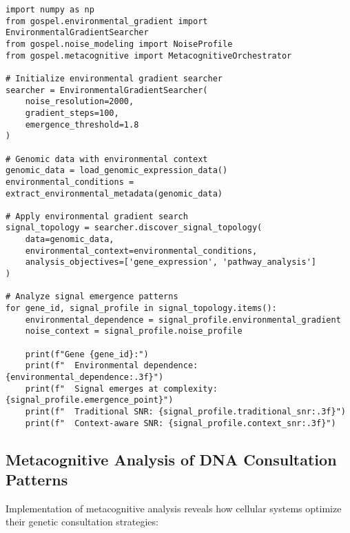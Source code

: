 \documentclass[12pt,a4paper]{article}
\begin{document}
\begin{lstlisting}[style=pythonstyle, caption=Environmental Gradient Search in Genomic Analysis]
import numpy as np
from gospel.environmental_gradient import EnvironmentalGradientSearcher
from gospel.noise_modeling import NoiseProfile
from gospel.metacognitive import MetacognitiveOrchestrator

# Initialize environmental gradient searcher
searcher = EnvironmentalGradientSearcher(
    noise_resolution=2000,
    gradient_steps=100,
    emergence_threshold=1.8
)

# Genomic data with environmental context
genomic_data = load_genomic_expression_data()
environmental_conditions = extract_environmental_metadata(genomic_data)

# Apply environmental gradient search
signal_topology = searcher.discover_signal_topology(
    data=genomic_data,
    environmental_context=environmental_conditions,
    analysis_objectives=['gene_expression', 'pathway_analysis']
)

# Analyze signal emergence patterns
for gene_id, signal_profile in signal_topology.items():
    environmental_dependence = signal_profile.environmental_gradient
    noise_context = signal_profile.noise_profile
    
    print(f"Gene {gene_id}:")
    print(f"  Environmental dependence: {environmental_dependence:.3f}")
    print(f"  Signal emerges at complexity: {signal_profile.emergence_point}")
    print(f"  Traditional SNR: {signal_profile.traditional_snr:.3f}")
    print(f"  Context-aware SNR: {signal_profile.context_snr:.3f}")
\end{lstlisting}

\subsection{Metacognitive Analysis of DNA Consultation Patterns}

Implementation of metacognitive analysis reveals how cellular systems optimize their genetic consultation strategies:
\end{document}
